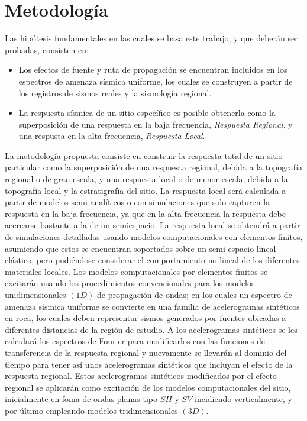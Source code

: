 \documentclass[spanish,letterpaper,12pt,twoside,openany]{article}
\begin{document}
\section{Metodología}
%
Las hipótesis fundamentales en las cuales se basa este trabajo, y que deberán ser probadas, consisten en:
%
\begin{itemize}
%
	\item Los efectos de fuente y ruta de propagación se encuentran incluidos en los espectros de amenaza sísmica uniforme, los cuales se construyen a partir de los registros de sismos reales y la sismología regional.
	\item La respuesta sísmica de un sitio específico es posible obtenerla como la superposición de una respuesta en la baja frecuencia, \textit{Respuesta Regional}, y una respusta en la alta frecuencia, \textit{Respuesta Local}.
	\vspace{-.5 cm}
%
\end{itemize}
%
La metodología propuesta consiste en construir la respuesta total de un sitio particular como la superposición de una respuesta regional, debida a la topografía regional o de gran escala, y una respuesta local o de menor escala, debida a la topografía local y la estratigrafía del sitio. La respuesta local será calculada a partir de modelos semi-analíticos o con simulaciones que solo capturen la respuesta en la baja frecuencia, ya que en la alta frecuencia la respuesta debe acercarse bastante a la de un semiespacio. La respuesta local se obtendrá a partir de simulaciones detalladas usando modelos computacionales con elementos finitos, asumiendo que estos se encuentran soportados sobre un semi-espacio lineal elástico, pero pudiéndose considerar el comportamiento no-lineal de los diferentes materiales locales. Los modelos computacionales por elementos finitos se excitarán usando los procedimientos convencionales para los modelos unidimensionales $\left( 1D \right)$ de propagación de ondas; en los cuales un espectro de amenaza sísmica uniforme se convierte en una familia de acelerogramas sintéticos en roca, los cuales deben representar sismos generados por fuentes ubicadas a diferentes distancias de la región de estudio. A los acelerogramas sintéticos se les calculará los espectros de Fourier para modificarlos con las funciones de transferencia de la respuesta regional y nuevamente se llevarán al dominio del tiempo para tener así unos acelerogramas sintéticos que incluyan el efecto de la respuesta regional. Estos acelerogramas sintéticos modificados por el efecto regional se aplicarán como excitación de los modelos computacionales del sitio, inicialmente en foma de ondas planas tipo $SH$ y $SV$ incidiendo verticalmente, y por último empleando modelos tridimensionales $\left( 3D \right)$.\\
\end{document}
